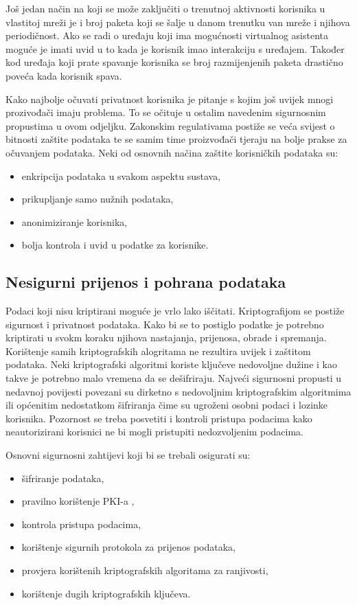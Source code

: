 \documentclass[times, utf8, diplomski]{fer}
\begin{document}
Još jedan način na koji se može zaključiti o trenutnoj aktivnosti korisnika u vlastitoj mreži je i broj paketa koji se šalje u danom trenutku van mreže i njihova periodičnost. Ako se radi o uređaju koji ima mogućnosti virtualnog asistenta moguće je imati uvid u to kada je korisnik imao interakciju s uređajem. Također kod uređaja koji prate spavanje korisnika se broj razmijenjenih paketa drastično poveća kada korisnik spava.\citep{Apthorpe2017May}

Kako najbolje očuvati privatnost korisnika je pitanje s kojim još uvijek mnogi prozivođači imaju problema. To se očituje u ostalim navedenim sigurnosnim propustima u ovom odjeljku. Zakonskim regulativama postiže se veća svijest o bitnosti zaštite podataka te se samim time proizvođači tjeraju na bolje prakse za očuvanjem podataka. Neki od osnovnih načina zaštite korisničkih podataka su: 
\begin{itemize}
    \item enkripcija podataka u svakom aspektu sustava,
    \item prikupljanje samo nužnih podataka,
    \item anonimiziranje korisnika,
    \item bolja kontrola i uvid u podatke za korisnike.
\end{itemize}

\subsection{Nesigurni prijenos i pohrana podataka}
Podaci koji nisu kriptirani moguće je vrlo lako iščitati. Kriptografijom se postiže sigurnost i privatnost podataka. Kako bi se to postiglo podatke je potrebno kriptirati u svokm koraku njihova nastajanja, prijenosa, obrade i spremanja. Korištenje samih kriptografskih alogritama ne rezultira uvijek i zaštitom podataka. Neki kriptografski algoritmi koriste ključeve nedovoljne dužine i kao takve je potrebno malo vremena da se dešifriraju. Najveći sigurnosni propusti u nedavnoj povijesti povezani su dirketno s nedovoljnim kriptografskim algoritmima ili općenitim nedostatkom šifriranja čime su ugroženi osobni podaci i lozinke korisnika.\citep{DataBreaches} Pozornost se treba posvetiti i kontroli pristupa podacima kako neautorizirani korisnici ne bi mogli pristupiti nedozvoljenim podacima. 

Osnovni sigurnosni zahtijevi koji bi se trebali osigurati su: \begin{itemize}
    \item šifriranje podataka,
    \item pravilno korištenje PKI-a ,
    \item kontrola pristupa podacima,
    \item korištenje sigurnih protokola za prijenos podataka,
    \item provjera korištenih kriptografskih algoritama za ranjivosti,
    \item korištenje dugih kriptografskih ključeva.
\end{itemize}     
\end{document}
